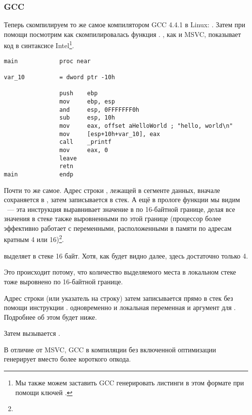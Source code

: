 \subsubsection{GCC}

Теперь скомпилируем то же самое компилятором GCC 4.4.1 в Linux: .
Затем при помощи \IDA посмотрим как скомпилировалась функция \main.
\IDA, как и MSVC, показывает код в синтаксисе Intel\footnote{Мы также можем заставить GCC генерировать листинги в этом формате при помощи ключей .}.

\begin{lstlisting}[caption=код в \IDA,style=customasmx86]
main            proc near

var_10          = dword ptr -10h

                push    ebp
                mov     ebp, esp
                and     esp, 0FFFFFFF0h
                sub     esp, 10h
                mov     eax, offset aHelloWorld ; "hello, world\n"
                mov     [esp+10h+var_10], eax
                call    _printf
                mov     eax, 0
                leave
                retn
main            endp
\end{lstlisting}

Почти то же самое. 
Адрес строки , лежащей в сегменте данных, вначале сохраняется в \EAX, затем записывается в стек.
А ещё в прологе функции мы видим ~--- 
эта инструкция выравнивает значение в \ESP по 16-байтной границе, делая все значения 
в стеке также выровненными по этой границе (процессор более эффективно работает с переменными, расположенными
в памяти по адресам кратным 4 или 16)\footnote{\URLWPDA}.

 выделяет в стеке 16 байт. Хотя, как будет видно далее, здесь достаточно только 4.

Это происходит потому, что количество выделяемого места в локальном стеке тоже выровнено по 16-байтной границе.

Адрес строки (или указатель на строку) затем записывается прямо в стек без помощи инструкции \PUSH.
 одновременно и локальная переменная и аргумент для \printf{}. Подробнее об этом будет ниже.

Затем вызывается \printf.

В отличие от MSVC, GCC в компиляции без включенной оптимизации генерирует  вместо более короткого опкода.

